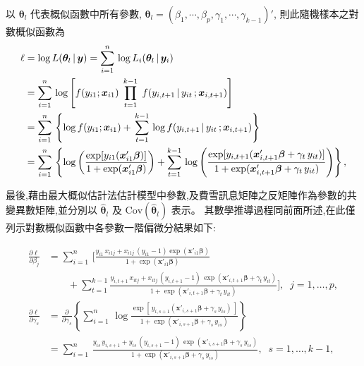 以 $\bm{\theta}_l$ 代表概似函數中所有參數, $\bm{\theta}_l=(\beta_1,\cdots,\beta_p,\gamma_1,\cdots,\gamma_{k-1})'$, 則此隨機樣本之對數概似函數為
\begin{align}
 \ell &=\log L(\bm{\theta}_l\,|\,\bm{y}) = \sum_{i=1}^n\, \log L_i(\bm{\theta}_l\,|\,\bm{y}_i)    \notag\\
      &=\sum_{i=1}^n\, \log \left[f(y_{i1};\bm{x}_{i1}) \;\prod_{t=1}^{k-1}\; f(y_{i,t+1} \,|\, y_{it}\,;\bm{x}_{i,t+1}) \right] \notag\\
      &=\sum_{i=1}^n\, \left\{ \log f(y_{i1};\bm{x}_{i1}) + \,\sum_{t=1}^{k-1} \, \log f(y_{i,t+1} \,|\, y_{it}\,;\bm{x}_{i,t+1}) \right\} \notag\\
      &=\sum_{i=1}^n \, \left\{ \log \left(\frac{\exp[y_{i1}(\bm{x}'_{i1}\bm{\beta})]}{1+\exp(\bm{x}'_{i1}\bm{\beta})} \right) + \sum_{t=1}^{k-1} \, \log \left( \frac{\exp[y_{i,t+1}(\bm{x}'_{i,t+1}\bm{\beta} +\gamma_t \, y_{it})]}{1+\exp(\bm{x}'_{i,t+1}\bm{\beta} +\gamma_t \, y_{it})} \right) \right\},
\end{align}

最後,藉由最大概似估計法估計模型中參數,及費雪訊息矩陣之反矩陣作為參數的共變異數矩陣,並分別以 $\hat{\bm{\theta}}_l$ 及 $\mbox{Cov}(\hat{\bm{\theta}}_l)$ 表示。
其數學推導過程同前面所述,在此僅列示對數概似函數中各參數一階偏微分結果如下:

\begin{align*}
    \frac{\partial \ell}{\partial \beta_j} &=\sum_{i=1}^n \,\Bigg [ \frac{y_{i1}\, x_{i1j} + x_{i1j}\,(y_{i1}-1)\exp(\bm{x}'_{i1}\bm{\beta})}{1+\exp(\bm{x}'_{i1}\bm{\beta})} \\
                                           &\qquad + \sum_{t=1}^{k-1} \frac{y_{i,t+1} \, x_{itj} + x_{itj}\,(y_{i,t+1}-1)\, \exp(\bm{x}'_{i,t+1}\bm{\beta} +\gamma_t \, y_{it})}{1+\exp(\bm{x}'_{i,t+1}\bm{\beta} +\gamma_t \, y_{it})} \Bigg],\;\; j=1,\ldots,p, \\
    \frac{\partial \ell}{\partial \gamma_s} &= \frac{\partial}{\partial \gamma_s} \left\{ \sum_{i=1}^n \, \log  \frac{\exp[\,y_{i,s+1}(\bm{x}'_{i,s+1}\bm{\beta} +\gamma_s \, y_{is})\,]}{1+\exp(\bm{x}'_{i,s+1}\bm{\beta} +\gamma_s \, y_{is})} \right\} \\
                                            &=\sum_{i=1}^n \, \frac{y_{is}\, y_{i,s+1}+ y_{is}\,(y_{i,s+1}-1)\,\exp (\bm{x}'_{i,s+1} \bm{\beta} +\gamma_s \, y_{is})}{1+\exp(\bm{x}'_{i,s+1} \bm{\beta} +\gamma_s \, y_{is})},\;\; s=1,\ldots,k-1,\\
\end{align*}

